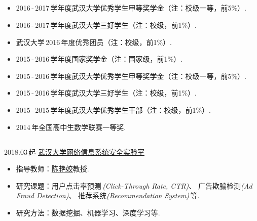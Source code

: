 \documentclass[letterpaper,AutoFakeBold]{twentysecondcv} %
\begin{document}
\begin{CJK*}{UTF8}{gbsn}


\begin{CJK*}{UTF8}{gkai}
\section{}
\end{CJK*}

\begin{itemize}
	\setlength{\itemsep}{0pt}
	\setlength{\parsep}{0pt}
	\setlength{\parskip}{0pt}
	\item 2016\,-\,2017\,学年度武汉大学优秀学生甲等奖学金（注：校级一等，前5\%）.
	\item 2016\,-\,2017\,学年度武汉大学三好学生（注：校级，前1\%）.
	\item 武汉大学\,2016\,年度优秀团员（注：校级，前1\%）.
	\item 2015\,-\,2016\,学年度国家奖学金（注：国家级，前1\%）.
	\item 2015\,-\,2016\,学年度武汉大学优秀学生甲等奖学金（注：校级一等，前5\%）.
	\item 2015\,-\,2016\,学年度武汉大学三好学生（注：校级，前1\%）.
	\item 2015\,-\,2015\,学年度武汉大学优秀学生干部（注：校级，前1\%）.
	\item 2014\,年全国高中生数学联赛一等奖.
\end{itemize}


\begin{CJK*}{UTF8}{gkai}
\section{}
\end{CJK*}

2018.03\,起 \qquad \href{http://nisplab.whu.edu.cn/index.html}{武汉大学网络信息系统安全实验室}
\begin{itemize}
	\item 指导教师：\href{http://iqua.ece.toronto.edu/ychen/}{陈艳姣}教授.
	\item 研究课题：用户点击率预测\,\emph{(Click-Through Rate, CTR)}、
	广告欺骗检测\emph{(Ad Fraud Detection)}、
	推荐系统\emph{(Recommendation System)}\,等.
	\item 研究方法：数据挖掘、机器学习、深度学习等.
\end{itemize}


\end{CJK*}
\end{document}
